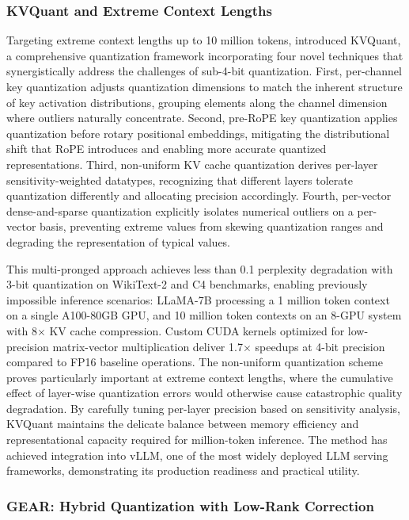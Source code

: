 \subsubsection{KVQuant and Extreme Context Lengths}

Targeting extreme context lengths up to 10 million tokens, \citet{hooper2024kvquant} introduced KVQuant, a comprehensive quantization framework incorporating four novel techniques that synergistically address the challenges of sub-4-bit quantization. First, per-channel key quantization adjusts quantization dimensions to match the inherent structure of key activation distributions, grouping elements along the channel dimension where outliers naturally concentrate. Second, pre-RoPE key quantization applies quantization before rotary positional embeddings, mitigating the distributional shift that RoPE introduces and enabling more accurate quantized representations. Third, non-uniform KV cache quantization derives per-layer sensitivity-weighted datatypes, recognizing that different layers tolerate quantization differently and allocating precision accordingly. Fourth, per-vector dense-and-sparse quantization explicitly isolates numerical outliers on a per-vector basis, preventing extreme values from skewing quantization ranges and degrading the representation of typical values.

This multi-pronged approach achieves less than 0.1 perplexity degradation with 3-bit quantization on WikiText-2 and C4 benchmarks, enabling previously impossible inference scenarios: LLaMA-7B processing a 1 million token context on a single A100-80GB GPU, and 10 million token contexts on an 8-GPU system with 8$\times$ KV cache compression. Custom CUDA kernels optimized for low-precision matrix-vector multiplication deliver 1.7$\times$ speedups at 4-bit precision compared to FP16 baseline operations. The non-uniform quantization scheme proves particularly important at extreme context lengths, where the cumulative effect of layer-wise quantization errors would otherwise cause catastrophic quality degradation. By carefully tuning per-layer precision based on sensitivity analysis, KVQuant maintains the delicate balance between memory efficiency and representational capacity required for million-token inference. The method has achieved integration into vLLM, one of the most widely deployed LLM serving frameworks, demonstrating its production readiness and practical utility.

\subsubsection{GEAR: Hybrid Quantization with Low-Rank Correction}

